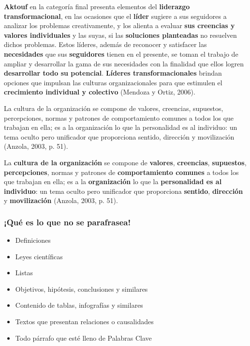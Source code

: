 \documentclass[
11pt, %
]{beamer}
\begin{document}
\begin{frame}
	\begin{block}{} %
		\textbf{Aktouf} en la categoría final presenta elementos del \textbf{liderazgo transformacional}, en las ocasiones que el \textbf{líder} sugiere a sus seguidores a analizar los problemas creativamente, y los alienta a evaluar \textbf{sus creencias y valores individuales} y las suyas, si las \textbf{soluciones planteadas} no resuelven dichos problemas. Estos líderes, además de reconocer y satisfacer las \textbf{necesidades} que sus \textbf{seguidores} tienen en el presente, se toman el trabajo de ampliar y desarrollar la gama de sus necesidades con la finalidad que ellos logren \textbf{desarrollar todo su potencial}. \textbf{Líderes transformacionales} brindan opciones que impulsan las culturas organizacionales para que estimulen el \textbf{crecimiento individual y colectivo} (Mendoza y Ortiz, 2006).
	\end{block}
\end{frame}


\begin{frame}
	\begin{block}{} %
		La cultura de la organización se compone de valores, creencias, supuestos, percepciones, normas y patrones de comportamiento comunes a todos los que trabajan en ella; es a la organización lo que la personalidad es al individuo: un tema oculto pero unificador que proporciona sentido, dirección y movilización (Anzola, 2003, p. 51).
	\end{block}
\end{frame}

\begin{frame}
	\begin{block}{} %
		La \textbf{cultura de la organización} se compone de \textbf{valores}, \textbf{creencias}, \textbf{supuestos}, \textbf{percepciones}, normas y patrones de \textbf{comportamiento comunes} a todos los que trabajan en ella; es a la \textbf{organización} lo que la \textbf{personalidad es al individuo}: un tema oculto pero unificador que proporciona \textbf{sentido}, \textbf{dirección} y \textbf{movilización} (Anzola, 2003, p. 51).
	\end{block}
\end{frame}

\begin{frame}
	\frametitle{¡Qué es lo que no se parafrasea!}
	\begin{itemize}
		\item Definiciones
		\item Leyes científicas
		\item Listas
		\item Objetivos, hipótesis, conclusiones y similares
		\item Contenido de tablas, infografías y similares
		\item Textos que presentan relaciones o causalidades
		\item Todo párrafo que esté lleno de Palabras Clave
	\end{itemize}
\end{frame}
\end{document}
